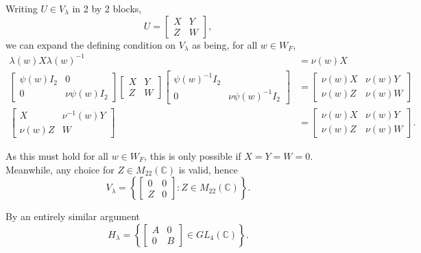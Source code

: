 \documentclass{memoir}
\newcommand{\lset}{\left\lbrace}
\newcommand{\rset}{\right\rbrace}
\newcommand{\bc}{\mathbb{C}}
\theoremstyle{definition}
\begin{document}
	Writing $U\in V_\lambda$ in 2 by 2 blocks,
	$$U=\begin{bmatrix}
		X & Y \\
		Z & W
	\end{bmatrix},$$
	we can expand the defining condition on $V_\lambda$ as being, for all $w\in W_F$,
	\begin{align*}
		\lambda(w)X\lambda(w)^{-1}&=\nu(w)X\\
		\begin{bmatrix}
			\psi(w)I_2 & 0 \\
			0 & \nu\psi(w)I_2
		\end{bmatrix}\begin{bmatrix}
			X & Y \\
			Z & W
		\end{bmatrix}\begin{bmatrix}
			\psi(w)^{-1}I_2 & \\
			0 & \nu\psi(w)^{-1}I_2
		\end{bmatrix}&=\begin{bmatrix}
			\nu(w)X & \nu(w)Y\\
			\nu(w)Z & \nu(w)W
		\end{bmatrix}\\
		\begin{bmatrix}
			X & \nu^{-1}(w)Y \\
			\nu(w)Z & W
		\end{bmatrix}&=\begin{bmatrix}
			\nu(w)X & \nu(w)Y\\
			\nu(w)Z & \nu(w)W
		\end{bmatrix}.
	\end{align*}
	
	As this must hold for all $w\in W_F$, this is only possible if $X=Y=W=0$.  
	Meanwhile, any choice for $Z\in M_{22}(\bc)$ is valid, hence
	$$V_\lambda=\lset\begin{bmatrix}
		0 & 0 \\
		Z & 0 
	\end{bmatrix} : Z\in M_{22}(\bc)\rset.$$ 
	
	By an entirely similar argument 
	$$H_\lambda=\lset\begin{bmatrix}
		A & 0 \\
		0 & B
	\end{bmatrix}\in GL_4(\bc)\rset.$$
	
\end{document}
